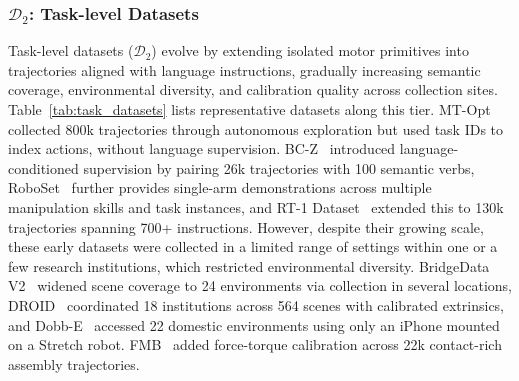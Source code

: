 \documentclass[acmsmall,screen,review]{acmart}
\begin{document}
\subsubsection{$\mathcal{D}_2$: Task-level Datasets}\label{sec:task_datasets_narrative}

Task-level datasets (\(\mathcal{D}_2\)) evolve by extending isolated motor primitives into trajectories aligned with language instructions, gradually increasing semantic coverage, environmental diversity, and calibration quality across collection sites. 
Table~\ref{tab:task_datasets} lists representative datasets along this tier.
MT-Opt~\cite{kalashnikov2021mt} collected 800k trajectories through autonomous exploration but used task IDs to index actions, without language supervision. 
BC-Z~\cite{jang2022bc} introduced language-conditioned supervision by pairing 26k trajectories with 100 semantic verbs, 
RoboSet~\cite{bharadhwaj2024roboagent} further provides single-arm demonstrations across multiple manipulation skills and task instances,
and RT-1 Dataset~\cite{brohan2023rt1} extended this to 130k trajectories spanning 700+ instructions. 
However, despite their growing scale, these early datasets were collected in a limited range of settings within one or a few research institutions, which restricted environmental diversity.
BridgeData V2~\cite{walke2024bridgedatav2} widened scene coverage to 24 environments via collection in several locations, 
DROID~\cite{khazatsky2024droid} coordinated 18 institutions across 564 scenes with calibrated extrinsics, 
and Dobb-E~\cite{shafiullah2023bringing} accessed 22 domestic environments using only an iPhone mounted on a Stretch robot. 
FMB~\cite{fu2025fmb} added force-torque calibration across 22k contact-rich assembly trajectories. 
\end{document}
